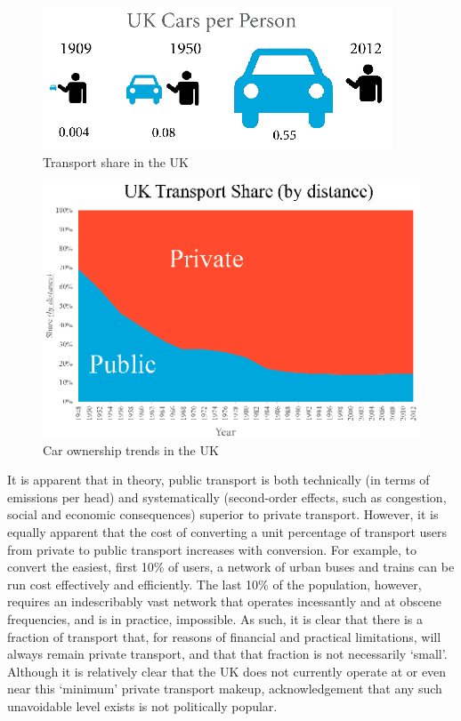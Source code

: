 \documentclass[conference]{IEEEtran}
\begin{document}
\begin{figure}[!htp]
\centering
\includegraphics[width=\columnwidth]{images/ukcarsperperson.png}
\caption{Transport share in the UK}
\label{fig:ukcarsperperson}
\end{figure}

\begin{figure}[!htp]
\centering
\includegraphics[width=\columnwidth]{images/uktransportshare.png}
\caption{Car ownership trends in the UK}
\label{fig:uktransportshare}
\end{figure}

It is apparent that in theory, public transport is both technically
(in terms of emissions per head) and systematically (second-order
effects, such as congestion, social and economic consequences)
superior to private transport. However, it is equally apparent that
the cost of converting a unit percentage of transport users from
private to public transport increases with conversion. For example, to
convert the easiest, first 10\% of users, a network of urban buses and
trains can be run cost effectively and efficiently. The last 10\% of
the population, however, requires an indescribably vast network that
operates incessantly and at obscene frequencies, and is in practice,
impossible. As such, it is clear that there is a fraction of transport
that, for reasons of financial and practical limitations, will always
remain private transport, and that that fraction is not necessarily
`small'. Although it is relatively clear that the UK does not
currently operate at or even near this `minimum' private transport
makeup, acknowledgement that any such unavoidable level exists is not
politically popular.
\end{document}
